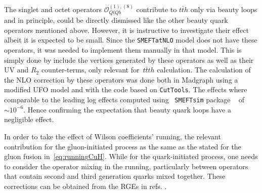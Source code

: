 %
\par The singlet and octet operators $\mathcal{O}_{QtQb}^{(1),(8)}$  contribute to $t \bar{t} h$ only via beauty loops and in principle, could be directly dismissed like the other beauty quark operators mentioned above. However, it is instructive to investigate their effect albeit it is expected to be small.
 Since the \texttt{SMEFTatNLO} model  does not have these operators, it was needed to implement them manually in that model. This is simply done by include the vertices generated by these operators as well as their UV and $R_2$ counter-terms, only relevant for~$t\bar tth$ calculation. The calculation of the NLO correction by these operators was done both in Madgraph using a modified UFO model and with the code based on  \texttt{CutTools}. The effects where comparable to the leading log effects computed using ~\texttt{SMEFTsim} package ~\cite{Brivio:2017btx} of $ \sim 10^{-6}$. Hence confirming the expectation that beauty quark loops have a negligible effect. 
%
\par In order to take the effect of Wilson coefficients' running, the relevant contribution for the gluon-initiated process as the same as the stated for the gluon fusion in~\eqref{eq:runningCuH}. While for the quark-initiated process, one needs to consider the operator mixing in the running, particularly between operators that contain second and third generation quarks mixed together. These corrections can be obtained from the RGEs in refs. \cite{Jenkins:2013zja,Jenkins:2013wua,Alonso:2013hga}.
